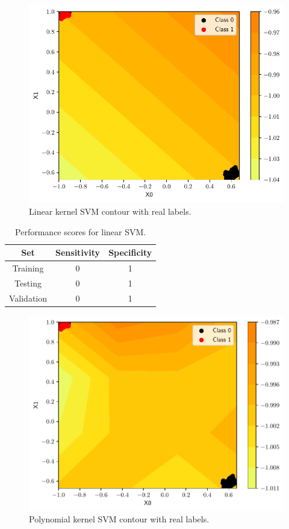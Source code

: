 \documentclass[conference]{IEEEtran}
\theoremstyle{definition}
\theoremstyle{remark}
\theoremstyle{remark}
\begin{document}
\begin{figure}[H]
  \centering
  \includegraphics[width=0.8\columnwidth]{figs/svm-emb-linear-contour-0-1.pdf}
  \caption{Linear kernel SVM contour with real labels.}
\end{figure}

\begin{table}[H]
  \centering
  \caption{Performance scores for linear SVM.}
  \label{tab:linear_SVM_emb}
  \begin{tabular}{ccc}
    \hline
    \textbf{Set} & \textbf{Sensitivity} & \textbf{Specificity} \\ \hline
    Training & 0 & 1 \\
    Testing & 0 & 1 \\
    Validation & 0 & 1 \\ \hline
  \end{tabular}
\end{table}

\begin{figure}
  \includegraphics[width=\columnwidth]{figs/svm-emb-poly-contour-0-1.pdf}
  \caption{Polynomial kernel SVM contour with real labels.}
\end{figure}
\end{document}
